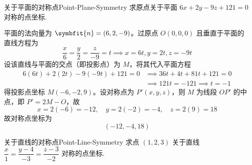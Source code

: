 \begin{problem}{关于平面的对称点}{Point-Plane-Symmetry}
    求原点关于平面 $6x + 2y - 9z + 121 = 0$ 对称的点坐标.
\end{problem}

\begin{solution}
    平面的法向量为 $\symbfit{n} = (6, 2, -9)$。过原点 $O(0, 0, 0)$ 且垂直于平面的直线方程为
    \begin{equation}
        \frac{x}{6} = \frac{y}{2} = \frac{z}{-9} = t \implies x = 6t, y = 2t, z = -9t
    \end{equation}
    设该直线与平面的交点（即投影点）为 $M$，将其代入平面方程
    \begin{equation}
        \begin{aligned}
            6(6t) + 2(2t) - 9(-9t) + 121 = 0
             & \implies 36t + 4t + 81t + 121 = 0    \\
             & \implies 121t = -121 \implies t = -1
        \end{aligned}
    \end{equation}
    得投影点坐标 $M(-6, -2, 9)$。设对称点为 $P'(x, y, z)$，则 $M$ 为线段 $OP'$ 的中点，即 $P' = 2M - O$，故
    \begin{equation}
        x = 2(-6) = -12, \quad y = 2(-2) = -4, \quad z = 2(9) = 18
    \end{equation}
    故对称点坐标为
    \begin{equation}
        \boxed{(-12, -4, 18)}
    \end{equation}
\end{solution}


\begin{problem}{关于直线的对称点}{Point-Line-Symmetry}
    求点 $(1, 2, 3)$ 关于直线 $\dfrac{x}{1} = \dfrac{y-4}{-3} = \dfrac{z-3}{-2}$ 对称的点坐标.
\end{problem}


